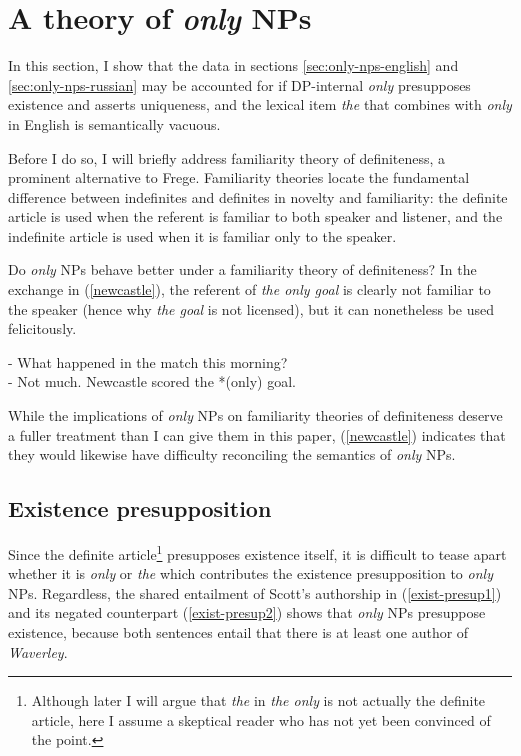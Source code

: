 \section{A theory of \textit{only} NPs \label{sec:my-theory}}
In this section, I show that the data in sections \ref{sec:only-nps-english} and \ref{sec:only-nps-russian} may be accounted for if DP-internal \textit{only} presupposes existence and asserts uniqueness, and the lexical item \textit{the} that combines with \textit{only} in English is semantically vacuous.

Before I do so, I will briefly address  familiarity theory of definiteness, a prominent alternative to Frege. Familiarity theories locate the fundamental difference between indefinites and definites in novelty and familiarity: the definite article is used when the referent is familiar to both speaker and listener, and the indefinite article is used when it is familiar only to the speaker.

Do \textit{only} NPs behave better under a familiarity theory of definiteness? In the exchange in (\ref{newcastle}), the referent of \textit{the only goal} is clearly not familiar to the speaker (hence why \textit{the goal} is not licensed), but it can nonetheless be used felicitously.

\begin{exe}
	\ex \label{newcastle}
	- What happened in the match this morning? \\
	- Not much. Newcastle scored the *(only) goal.
\end{exe}

While the implications of \textit{only} NPs on familiarity theories of definiteness deserve a fuller treatment than I can give them in this paper, (\ref{newcastle}) indicates that they would likewise have difficulty reconciling the semantics of \textit{only} NPs.

\subsection{Existence presupposition}
Since the definite article\footnote{Although later I will argue that \textit{the} in \textit{the only} is not actually the definite article, here I assume a skeptical reader who has not yet been convinced of the point.} presupposes existence itself, it is difficult to tease apart whether it is \textit{only} or \textit{the} which contributes the existence presupposition to \textit{only} NPs. Regardless, the shared entailment of Scott's authorship in (\ref{exist-presup1}) and its negated counterpart (\ref{exist-presup2}) shows that \textit{only} NPs presuppose existence, because both sentences entail that there is at least one author of \textit{Waverley}.

